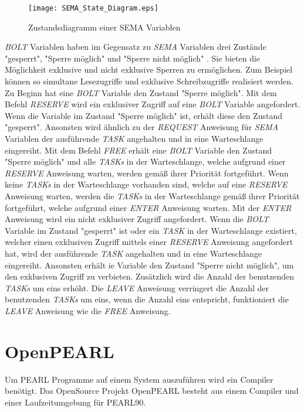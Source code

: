 \begin{figure}[ht]
  \texttt{[image: SEMA\_State\_Diagram.eps]}
  \caption{Zustandsdiagramm einer SEMA Variablen}
  \label{fig:SEMA_StateDiagram}
\end{figure}

\textit{BOLT} Variablen haben im Gegensatz zu \textit{SEMA} Variablen drei Zustände "gesperrt", "Sperre möglich" und "Sperre nicht möglich" \autocite[9--17]{PEARL}. Sie bieten die Möglichkeit exklusive und nicht exklusive Sperren zu ermöglichen. Zum Beispiel können so simultane Lesezugriffe und exklusive Schreibzugriffe realisiert werden. Zu Beginn hat eine \textit{BOLT} Variable den Zustand "Sperre möglich". Mit dem Befehl \textit{RESERVE} wird ein exklusiver Zugriff auf eine \textit{BOLT} Variable angefordert. Wenn die Variable im Zustand "Sperre möglich" ist, erhält diese den Zustand "gesperrt". Ansonsten wird ähnlich zu der \textit{REQUEST} Anweisung für \textit{SEMA} Variablen der ausführende \textit{TASK} angehalten und in eine Warteschlange eingereiht. Mit dem Befehl \textit{FREE} erhält eine \textit{BOLT} Variable den Zustand "Sperre möglich" und alle \textit{TASKs} in der Warteschlange, welche aufgrund einer \textit{RESERVE} Anweisung warten, werden gemäß ihrer Priorität fortgeführt. Wenn keine \textit{TASKs} in der Warteschlange vorhanden sind, welche auf eine \textit{RESERVE} Anweisung warten, werden die \textit{TASKs} in der Warteschlange gemäß ihrer Priorität fortgeführt, welche aufgrund einer \textit{ENTER} Anweisung warten. Mit der \textit{ENTER} Anweisung wird ein nicht exklusiver Zugriff angefordert. Wenn die \textit{BOLT} Variable im Zustand "gesperrt" ist oder ein \textit{TASK} in der Warteschlange existiert, welcher einen exklusiven Zugriff mittels einer \textit{RESERVE} Anweisung angefordert hat, wird der ausführende \textit{TASK} angehalten und in eine Warteschlange eingereiht. Ansonsten erhält ie Variable den Zustand "Sperre nicht möglich", um den exklusiven Zugriff zu verbieten. Zusätzlich wird die Anzahl der benutzenden \textit{TASKs} um eins erhöht. Die \textit{LEAVE} Anweisung verringert die Anzahl der benutzenden \textit{TASKs} um eins, wenn die Anzahl eins entspricht, funktioniert die \textit{LEAVE} Anweisung wie die \textit{FREE} Anweisung.

\section{OpenPEARL}
\label{section:OpenPEARL}
Um PEARL Programme auf einem System auszuführen wird ein Compiler benötigt.
Das OpenSource Projekt OpenPEARL besteht aus einem Compiler und einer Laufzeitumgebung für PEARL90.

